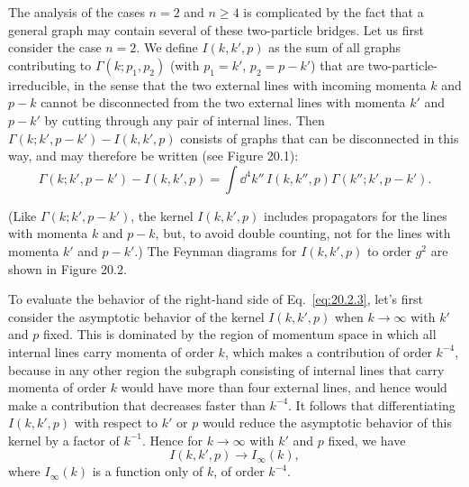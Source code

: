 The analysis of the cases $n=2$ and $n\geq4$ is complicated by the fact that
a general graph may contain several of these two-particle bridges. Let us
first consider the case $n=2$. We define $I(k,k',p)$ as the sum of all graphs
contributing to $\Gamma(k;p_1,p_2)$ (with $p_1=k'$,
$p_2=p-k'$) that are two-particle-irreducible, in the sense that the two
external lines with incoming momenta $k$ and $p-k$ cannot be disconnected
from the two external lines with momenta $k'$ and $p-k'$ by cutting through
any pair of internal lines. Then $\Gamma(k;k',p-k')-I(k,k',p)$ consists of
graphs that can be disconnected in this way, and may therefore be written
(see Figure 20.1):
\begin{equation}
 \Gamma(k;k',p-k')-I(k,k',p)
 =\int \dd^4k''\,I(k,k'',p)\Gamma(k'';k',p-k').
 \tag{20.2.3}\label{eq:20.2.3}
\end{equation}




(Like $\Gamma(k;k',p-k')$, the kernel $I(k,k',p)$ includes propagators for
the lines with momenta $k$ and $p-k$, but, to avoid double counting, not for
the lines with momenta $k'$ and $p-k'$.) The Feynman diagrams for
$I(k,k',p)$ to order $g^2$ are shown in Figure 20.2.

To evaluate the behavior of the right-hand side of Eq.~\eqref{eq:20.2.3},
let's first consider the asymptotic behavior of the kernel $I(k,k',p)$ when
$k\to\infty$ with $k'$ and $p$ fixed. This is dominated by the region of
momentum space in which all internal lines carry momenta of order $k$, which
makes a contribution of order $k^{-4}$, because in any other region the
subgraph consisting of internal lines that carry momenta of order $k$ would
have more than four external lines, and hence would make a contribution that
decreases faster than $k^{-4}$. It follows that differentiating $I(k,k',p)$
with respect to $k'$ or $p$ would reduce the asymptotic behavior of this
kernel by a factor of $k^{-1}$. Hence for $k\to\infty$ with $k'$ and $p$
fixed, we have
\begin{equation}
 I(k,k',p)\longrightarrow I_\infty(k),
 \tag{20.2.4}\label{eq:20.2.4}
\end{equation}
where $I_\infty(k)$ is a function only of $k$, of order $k^{-4}$.

